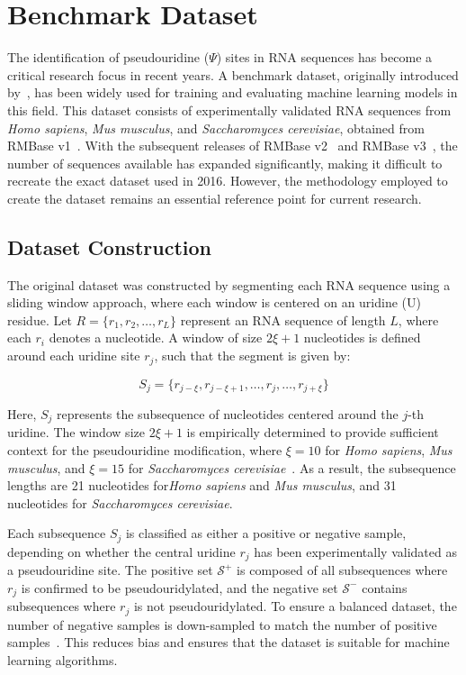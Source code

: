 \section{Benchmark Dataset}\label{sec:dataset}
  The identification of pseudouridine (\(\Psi\)) sites in RNA sequences has become a critical research focus in recent years.
  A benchmark dataset, originally introduced by~\cite{chen_irna-pseu_nodate}, has been widely used for training and evaluating machine learning models in this field.
  This dataset consists of experimentally validated RNA sequences from \textit{Homo sapiens}, \textit{Mus musculus}, and \textit{Saccharomyces cerevisiae}, obtained from RMBase v1~\cite{sun_rmbase_2016}.
  With the subsequent releases of RMBase v2~\cite{xuan_rmbase_2018} and RMBase v3~\cite{xuan_rmbase_2024}, the number of sequences available has expanded significantly, making it difficult to recreate the exact dataset used in 2016.
  However, the methodology employed to create the dataset remains an essential reference point for current research.

  \subsection{Dataset Construction}\label{subsec:dataset-construction}
    The original dataset was constructed by segmenting each RNA sequence using a sliding window approach, where each window is centered on an uridine (U) residue.
    Let \( R = \{r_1, r_2, \dots, r_L\} \) represent an RNA sequence of length \( L \), where each \( r_i \) denotes a nucleotide.
    A window of size \( 2\xi + 1 \) nucleotides is defined around each uridine site \( r_j \), such that the segment is given by:

    \[
      S_j = \{r_{j-\xi}, r_{j-\xi+1}, \dots, r_j, \dots, r_{j+\xi}\}
    \]

    Here, \( S_j \) represents the subsequence of nucleotides centered around the \( j \)-th uridine.
    The window size \( 2\xi + 1 \) is empirically determined to provide sufficient context for the pseudouridine modification, where \( \xi = 10 \) for \textit{Homo sapiens}, \textit{Mus musculus}, and \( \xi = 15 \) for \textit{Saccharomyces cerevisiae}~\cite{chen_irna-pseu_nodate}.
    As a result, the subsequence lengths are 21 nucleotides for\textit{Homo sapiens} and \textit{Mus musculus}, and 31 nucleotides for \textit{Saccharomyces cerevisiae}.

    Each subsequence \( S_j \) is classified as either a positive or negative sample, depending on whether the central uridine \( r_j \) has been experimentally validated as a pseudouridine site.
    The positive set \( \mathcal{S}^+ \) is composed of all subsequences where \( r_j \) is confirmed to be pseudouridylated, and the negative set \( \mathcal{S}^- \) contains subsequences where \( r_j \) is not pseudouridylated.
    To ensure a balanced dataset, the number of negative samples is down-sampled to match the number of positive samples~\cite{lee_downsampling_2022}.
    This reduces bias and ensures that the dataset is suitable for machine learning algorithms.

